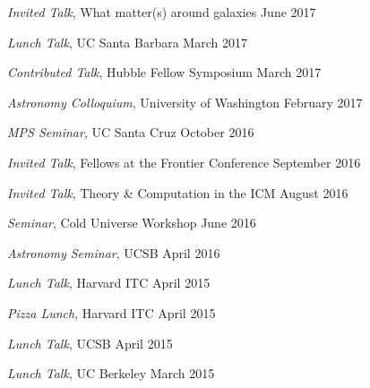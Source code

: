 \begin{talkenum}

\item \textit{Invited Talk}, What matter(s) around galaxies \hspace*{\fill} June 2017

\item \textit{Lunch Talk}, UC Santa Barbara \hspace*{\fill} March 2017

\item \textit{Contributed Talk}, Hubble Fellow Symposium \hspace*{\fill} March 2017

\item \textit{Astronomy Colloquium}, University of Washington \hspace*{\fill} February 2017

\item \textit{MPS Seminar}, UC Santa Cruz \hspace*{\fill} October 2016

\item \textit{Invited Talk}, Fellows at the Frontier Conference \hspace*{\fill} September 2016

\item \textit{Invited Talk}, Theory \& Computation in the ICM \hspace*{\fill} August 2016

\item \textit{Seminar}, Cold Universe Workshop \hspace*{\fill} June 2016

\item \textit{Astronomy Seminar}, UCSB \hspace*{\fill} April 2016

\item \textit{Lunch Talk}, Harvard ITC \hspace*{\fill} April 2015

\item \textit{Pizza Lunch}, Harvard ITC \hspace*{\fill} April 2015

\item \textit{Lunch Talk}, UCSB \hspace*{\fill} April 2015

\item \textit{Lunch Talk}, UC Berkeley \hspace*{\fill} March 2015


\end{talkenum}
